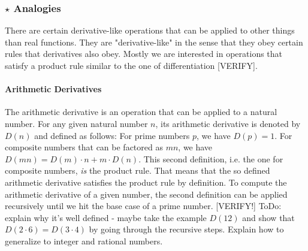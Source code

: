 
\subsubsection{$\star$ Analogies}
There are certain derivative-like operations that can be applied to other things than real functions. They are "derivative-like" in the sense that they obey certain rules that derivatives also obey. Mostly we are interested in operations that satisfy a product rule similar to the one of differentiation [VERIFY].


\paragraph{Arithmetic Derivatives} The arithmetic derivative is an operation that can be applied to a natural number. For any given natural number $n$, its arithmetic derivative is denoted by $D(n)$ and defined as follows: For prime numbers $p$, we have $D(p) = 1$. For composite numbers that can be factored as $m n$, we have $D(m n) = D(m) \cdot n + m \cdot D(n)$. This second definition, i.e. the one for composite numbers, \emph{is} the product rule. That means that the so defined arithmetic derivative satisfies the product rule by definition. To compute the arithmetic derivative of a given number, the second definition can be applied recursively until we hit the base case of a prime number. [VERIFY!] ToDo: explain why it's well defined - maybe take the example $D(12)$ and show that $D(2 \cdot 6) = D(3 \cdot 4)$ by going through the recursive steps. Explain how to generalize to integer and rational numbers.



